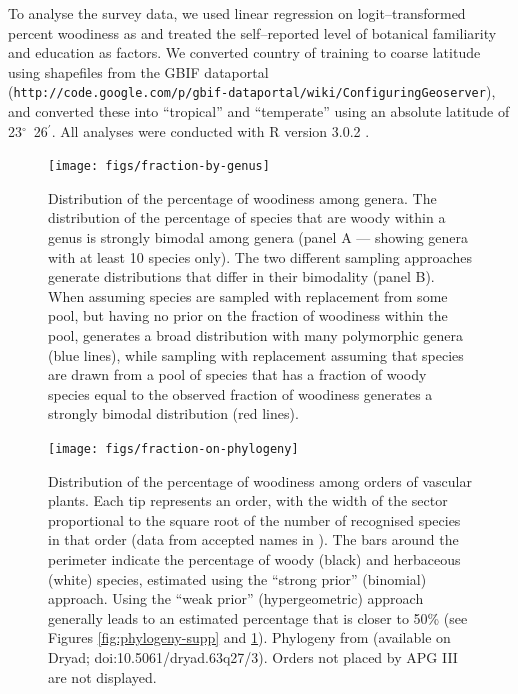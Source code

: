\documentclass[a4paper,12pt]{article}
\begin{document}
To analyse the survey data, we used linear regression on
logit--transformed percent woodiness as \citep[see][]{wartonarcsine}
and treated the self--reported level of botanical familiarity and
education as factors.  We converted country of training to coarse
latitude using shapefiles
from the GBIF dataportal\\
(\texttt{http://code.google.com/p/gbif-dataportal/wiki/ConfiguringGeoserver}),
and converted these into ``tropical'' and ``temperate'' using an
absolute latitude of 23$^\circ$~26$^\prime$.  All analyses were
conducted with R version 3.0.2 \citep{R}.





\begin{figure}[p]
  \centering
  \texttt{[image: figs/fraction-by-genus]}
  \caption{Distribution of the percentage of woodiness among genera.
    The distribution of the percentage of species that are woody within
    a genus is strongly bimodal among genera (panel A --- showing
    genera with at least 10 species only).
    The two different sampling approaches generate distributions that
    differ in their bimodality (panel B). When assuming species are
    sampled with replacement from some pool, but having no prior on
    the fraction of woodiness within the pool, generates a broad
    distribution with many polymorphic genera (blue lines), while
    sampling with replacement assuming that species are drawn from a
    pool of species that has a fraction of woody species equal to the
    observed fraction of woodiness generates a strongly bimodal
    distribution (red lines).}
  \label{fig:distribution-genera}
\end{figure}

\begin{figure}[p]
  \centering
  \texttt{[image: figs/fraction-on-phylogeny]}
  \caption{Distribution of the percentage of woodiness among orders of
    vascular plants.  Each tip represents an order, with the width of
    the sector proportional to the square root of the number of
    recognised species in that order (data from accepted names in
    \citet{ThePlantList}).  The bars around the perimeter indicate the
    percentage of woody (black) and herbaceous (white) species,
    estimated using the ``strong prior'' (binomial) approach.  Using
    the ``weak prior'' (hypergeometric) approach generally leads to an
    estimated percentage that is closer to 50\% (see Figures
    \ref{fig:phylogeny-supp} and \ref{fig:distribution-genera}).
    Phylogeny from \citet{Zanne} (available on Dryad; 
    doi:10.5061/dryad.63q27/3). Orders not placed by APG III
    \citep{APG3} are not displayed.}
\label{fig:phylogeny}
\end{figure}
\end{document}
